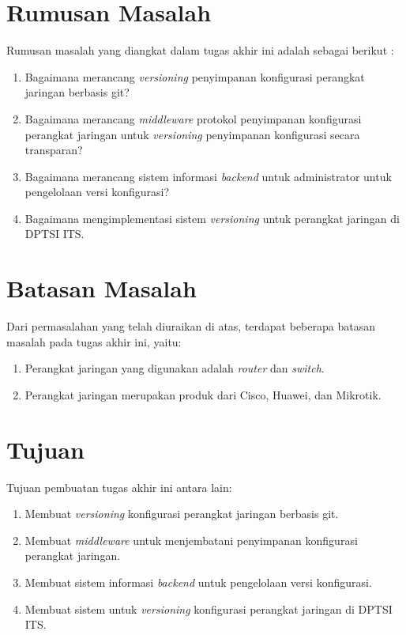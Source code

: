 	\section{Rumusan Masalah}
       	Rumusan masalah yang diangkat dalam tugas akhir ini adalah sebagai berikut :
		\begin{enumerate}
			\item Bagaimana merancang \textit{versioning} penyimpanan konfigurasi perangkat jaringan berbasis git?
			\item Bagaimana merancang \textit{middleware} protokol penyimpanan konfigurasi perangkat jaringan untuk \textit{versioning} penyimpanan konfigurasi secara transparan?
            \item Bagaimana merancang sistem informasi \textit{backend} untuk administrator untuk pengelolaan versi konfigurasi?
            \item Bagaimana mengimplementasi sistem \textit{versioning} untuk perangkat jaringan di DPTSI ITS.
		\end{enumerate}

	\section{Batasan Masalah}
		Dari permasalahan yang telah diuraikan di atas, terdapat beberapa batasan masalah pada tugas akhir ini, yaitu:
		\begin{enumerate}
			\item Perangkat jaringan yang digunakan adalah \textit{router} dan \textit{switch}.
            \item Perangkat jaringan merupakan produk dari Cisco, Huawei, dan Mikrotik.
           
		\end{enumerate}

	\section{Tujuan}
       	Tujuan pembuatan tugas akhir ini antara lain:
        \begin{enumerate}
        	\item Membuat \textit{versioning} konfigurasi perangkat jaringan berbasis git.
        	\item Membuat \textit{middleware} untuk menjembatani penyimpanan konfigurasi perangkat jaringan.
        	\item Membuat sistem informasi \textit{backend} untuk pengelolaan versi konfigurasi.
        	\item Membuat sistem untuk \textit{versioning} konfigurasi perangkat jaringan di DPTSI ITS.
        \end{enumerate}
        
